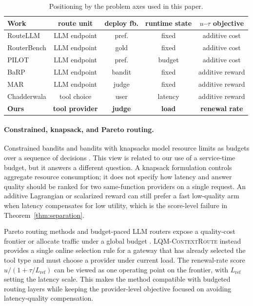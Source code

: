 \documentclass[11pt]{article}
\newcommand{\lqmcr}{\textsc{LQM-ContextRoute}}
\begin{document}
\begin{table}[H]
\centering\scriptsize
\setlength{\tabcolsep}{2.6pt}
\begin{tabular}{l c c c c}
\toprule
Work & route unit & deploy fb. & runtime state & $u$--$\tau$ objective \\
\midrule
RouteLLM    & LLM endpoint & pref. & fixed & additive cost \\
RouterBench & LLM endpoint & gold  & fixed & additive cost \\
PILOT       & LLM endpoint & pref. & budget & additive cost \\
BaRP        & LLM endpoint & bandit & fixed & additive reward \\
MAR         & LLM endpoint & judge & fixed & additive reward \\
Chadderwala & tool choice & user & latency & additive reward \\
\textbf{Ours} & \textbf{tool provider} & \textbf{judge} &
\textbf{load} & \textbf{renewal rate} \\
\bottomrule
\end{tabular}
\caption{Positioning by the problem axes used in this paper.}
\label{tab:related}
\end{table}

\paragraph{Constrained, knapsack, and Pareto routing.} Constrained bandits and bandits with knapsacks model resource limits as budgets over a sequence of decisions \citep{badanidiyuru2018bwk,agrawal2019bwk,combes2015bwk}. This view is related to our use of a service-time budget, but it answers a different question. A knapsack formulation controls aggregate resource consumption; it does not specify how latency and answer quality should be ranked for two same-function providers on a single request. An additive Lagrangian or scalarized reward can still prefer a fast low-quality arm when latency compensates for low utility, which is the score-level failure in Theorem~\ref{thm:separation}.

Pareto routing methods and budget-paced LLM routers expose a quality-cost frontier or allocate traffic under a global budget \citep{omnirouter2025,paretobandit2026}. \lqmcr{} instead provides a single online selection rule for a gateway that has already selected the tool type and must choose a provider under current load. The renewal-rate score $u/(1+\tau/L_{\text{ref}})$ can be viewed as one operating point on the frontier, with $L_{\text{ref}}$ setting the latency scale. This makes the method compatible with budgeted routing layers while keeping the provider-level objective focused on avoiding latency-quality compensation.
\end{document}
